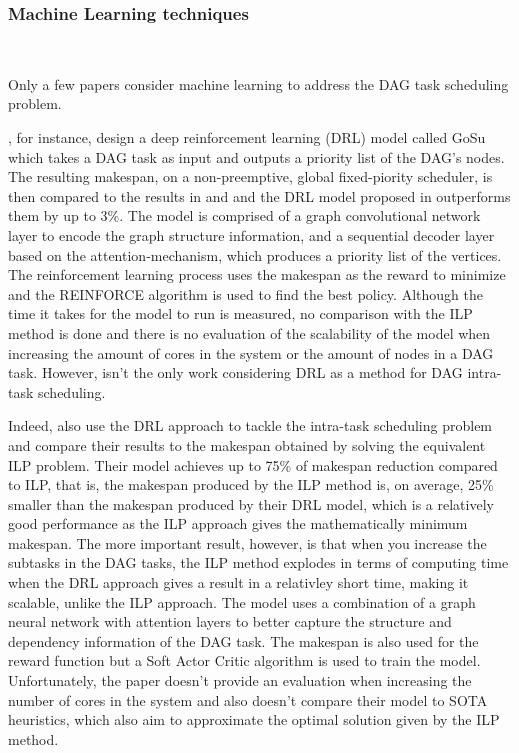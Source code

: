 \subsubsection{Machine Learning techniques}
~

Only a few papers consider machine learning 
to address the DAG task scheduling problem.

\citet{Lee2021GlobalDagSchedDRL}, for instance,
design a deep reinforcement learning (DRL) model called GoSu 
which takes a DAG task as input and outputs 
a priority list of the DAG's nodes.
The resulting makespan, on a non-preemptive, global fixed-piority scheduler, is 
then compared to the results in \cite{Zhao2022DAGsched} and \cite{He2019DagIntra}
and the DRL model proposed in \cite{Lee2021GlobalDagSchedDRL}
outperforms them by up to 3\%.
The model is comprised of a graph convolutional network 
layer to encode the graph structure information,
and a sequential decoder layer based on the attention-mechanism,
which produces a priority list of the vertices.
The reinforcement learning process uses the makespan as the reward to minimize
and the REINFORCE algorithm is used to find the best policy.
Although the time it takes for the model to run is measured,
no comparison with the ILP method is done and 
there is no evaluation of the scalability of the model 
when increasing the amount of cores in the system or the amount of nodes in a DAG task.
However, \citet{Lee2021GlobalDagSchedDRL} isn't the only work considering 
DRL as a method for DAG intra-task scheduling.

Indeed, \citet{Zhao2024GATDRLmodel} also 
use the DRL approach to tackle the intra-task scheduling 
problem and compare their results to the makespan
obtained by solving the equivalent ILP problem.
Their model achieves up to 75\% of makespan 
reduction compared to ILP, that is, the makespan 
produced by the ILP method is, on average, 25\% smaller than the 
makespan produced by their DRL model,
which is a relatively good performance as 
the ILP approach gives the mathematically minimum makespan.
The more important result, however,
is that when you increase the subtasks in the DAG tasks,
the ILP method explodes in terms of computing
time when the DRL approach gives a result in a relativley short time,
making it scalable, unlike the ILP approach.
The model uses a combination of a graph neural network 
with attention layers to better capture 
the structure and dependency information of the DAG task.
The makespan is also used for the reward function but 
a Soft Actor Critic algorithm is used to train the model. 
Unfortunately, the paper doesn't provide 
an evaluation when increasing the number of cores 
in the system and also doesn't compare their model 
to SOTA heuristics, which also aim to approximate 
the optimal solution given by the ILP method.

